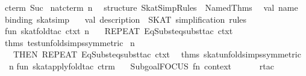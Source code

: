 \begin{isabellebody}
\isaantiq
cterm\ Suc{}%
\endisaantiq
\ {}nat{}cterm\ {}n\ {}\ {}{}{}\isanewline
\isanewline
structure\ SkatSimpRules\ {}\ Named{}Thms\isanewline
\ \ {}val\ name\ {}\ %
\isaantiq
binding\ {}skat{}simp{}{}%
\endisaantiq
\isanewline
\ \ \ val\ description\ {}\ {}SKAT\ simplification\ rules{}{}\isanewline
\isanewline
fun\ skat{}fold{}tac\ ctxt\ n\ {}\isanewline
\ \ REPEAT\ {}EqSubst{}eqsubst{}tac\ ctxt\ {}{}{}\ %
\isaantiq
thms\ test{}unfold{}simps{}symmetric{}{}%
\endisaantiq
\ n{}\isanewline
\ \ THEN\ REPEAT\ {}EqSubst{}eqsubst{}tac\ ctxt\ {}{}{}\ %
\isaantiq
thms\ skat{}unfold{}simps{}symmetric{}{}%
\endisaantiq
\ n{}\isanewline
\isanewline
fun\ skat{}apply{}fold{}tac\ ctrm\ {}\isanewline
\ \ Subgoal{}FOCUS\ {}fn\ {}context{}\ {}{}{}{}\ {}{}\isanewline
\ \ \ \ rtac\ %
\isaantiq

\end{isabellebody}
